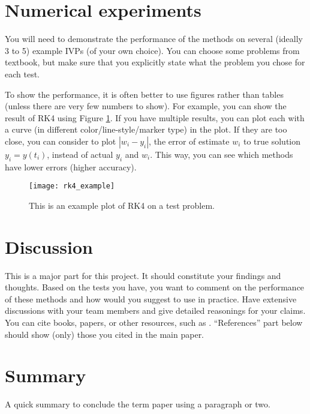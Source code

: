 \documentclass[11pt]{article}	%
\begin{document}
\section{Numerical experiments}
You will need to demonstrate the performance
of the methods on several (ideally 3 to 5) example IVPs (of your own choice).
You can choose some problems from textbook, but make sure that you
explicitly state what the problem you chose for each test.

To show the performance, it is often better to use figures
rather than tables (unless there are very few numbers to show).
For example, you can show the result of RK4
using Figure \ref{fig:rk4_example}. If you have multiple results, you can plot each
with a curve (in different color/line-style/marker type) in the plot. If they are too close, you can consider to
plot $|w_i-y_i|$, the error of estimate $w_i$ to true solution $y_i=y(t_i)$,
instead of actual $y_i$ and $w_i$. This way, you can see which methods have lower errors (higher accuracy).

\begin{figure}
\centering
\texttt{[image: rk4\_example]}
\caption{This is an example plot of RK4 on a test problem.}
\label{fig:rk4_example}
\end{figure}

\section{Discussion}
This is a major part for this project. It should constitute your findings and thoughts.
Based on the tests you have,
you want to comment on the performance of these methods and how would you
suggest to use in practice. Have extensive discussions with your team members
and give detailed reasonings for your claims. You can cite books, papers, or other
resources, such as \cite{Burden:2011a}. ``References'' part below should show
(only) those you cited in the main paper.


\section{Summary}
A quick summary to conclude the term paper using a paragraph or two.



\end{document}

